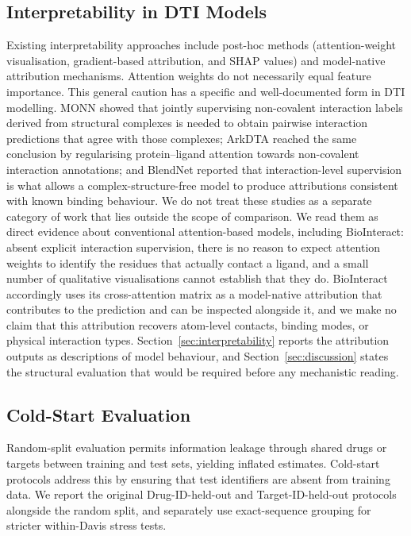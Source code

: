 \documentclass[fleqn,10pt]{wlscirep}
\begin{document}
\subsection{Interpretability in DTI Models}

Existing interpretability approaches include post-hoc methods (attention-weight
visualisation, gradient-based attribution, and SHAP values\cite{jimenez2020drug})
and model-native attribution mechanisms.  Attention weights do not necessarily
equal feature importance.\cite{jain2019attention}
This general caution has a specific and well-documented form in DTI modelling.
MONN showed that jointly supervising non-covalent interaction labels derived
from structural complexes is needed to obtain pairwise interaction predictions
that agree with those complexes;\cite{li2020monn} ArkDTA reached the same
conclusion by regularising protein--ligand attention towards non-covalent
interaction annotations;\cite{gim2023arkdta} and BlendNet reported that
interaction-level supervision is what allows a complex-structure-free model to
produce attributions consistent with known binding
behaviour.\cite{seo2024blendnet}  We do not treat these studies as a separate
category of work that lies outside the scope of comparison.  We read them as
direct evidence about conventional attention-based models, including
BioInteract: absent explicit interaction supervision, there is no reason to
expect attention weights to identify the residues that actually contact a
ligand, and a small number of qualitative visualisations cannot establish that
they do.  BioInteract accordingly uses its cross-attention matrix as a
model-native attribution that contributes to the prediction and can be inspected
alongside it, and we make no claim that this attribution recovers atom-level
contacts, binding modes, or physical interaction types.  Section~\ref{sec:interpretability}
reports the attribution outputs as descriptions of model behaviour, and
Section~\ref{sec:discussion} states the structural evaluation that would be
required before any mechanistic reading.

\subsection{Cold-Start Evaluation}

Random-split evaluation permits information leakage through shared drugs or
targets between training and test sets, yielding inflated
estimates.\cite{huang2021therapeutics}  Cold-start protocols address this by
ensuring that test identifiers are absent from training data. We report the
original Drug-ID-held-out and Target-ID-held-out protocols alongside the random
split, and separately use exact-sequence grouping for stricter within-Davis
stress tests.
\end{document}
